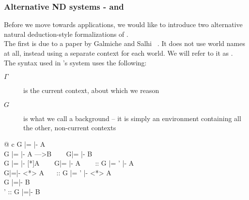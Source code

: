 \subsubsection{Alternative ND systems - \logicLF{} and \logicHyb{}}
Before we move towards applications, we would like to introduce two alternative natural deduction-style formalizations of \logic{}.\\
The first is due to a paper by Galmiche and Salhi ~\cite{labelfree}. It does not use world names at all, instead using a separate context for each world. We will refer to it as \logicLF{}.\\

The syntax used in \logicLF{}'s \ND{} system uses the following:
\begin{description}
\item[$\Gamma$] is the current context, about which we reason
\item[$G$] is what we call a background -- it is simply an environment containing all the other, non-current contexts
\end{description}
\newpage
\textbf{\logicLF{}}
\begin{center}
\footnotesize
\begin{spacing}{2.5}
\begin{tabular}{@{} c }
			{G |= \Gamma |- A}\\

			    {G |= \Gamma |- A --->B} ~~~ 
			     {G|= \Gamma |- B}\\

			     {G |= \Gamma |- [*]A} ~~~
				 {G|= \Gamma |- A} ~~~
			      {\Gamma :: G |= \Gamma' |- A}\\

			     {G|=\Gamma |- <*> A}~~~
			     {\Gamma :: G |= \Gamma' |- <*> A} \\

	{G |=\Gamma |- B}\\

	{\Gamma' :: G |=\Gamma |- B}
\end{tabular}\\
\end{spacing}
\normalsize
\end{center}

